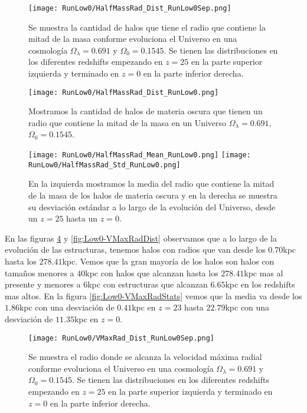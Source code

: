 \begin{figure}[H]
    \centering
    \texttt{[image: RunLow0/HalfMassRad\_Dist\_RunLow0Sep.png]}
    \caption[Radio que contiene la mitad de la masa]{\footnotesize Se muestra la cantidad de halos que tiene el radio que contiene la mitad de la masa conforme evoluciona el Universo en una cosmología $\Omega_\lambda = 0.691$ y $\Omega_0 = 0.1545$. Se tienen las distribuciones en los diferentes redshifts empezando en $z=25$ en la parte superior izquierda y terminado en $z=0$ en la parte inferior derecha.}
    \label{fig:Low0-HalfMassRadDistSep}
\end{figure}

\begin{figure}[H]
    \centering
    \texttt{[image: RunLow0/HalfMassRad\_Dist\_RunLow0.png]}
    \caption[Distribución del radio que contiene la mitad de la masa]{\footnotesize Mostramos la cantidad de halos de materia oscura que tienen un radio que contiene la mitad de la masa en un Universo $\Omega_\lambda = 0.691$, $\Omega_0 = 0.1545$.}
    \label{fig:Low0-HalfMassRadDist}
\end{figure}

\begin{figure}[H]
    \centering
    \texttt{[image: RunLow0/HalfMassRad\_Mean\_RunLow0.png]}
    \texttt{[image: RunLow0/HalfMassRad\_Std\_RunLow0.png]}
    \caption[Media y desviación estándar del radio de la mitad de la masa]{\footnotesize En la izquierda mostramos la media del radio que contiene la mitad de la masa de los halos de materia oscura y en la derecha se muestra su desviación estándar a lo largo de la evolución del Universo, desde un $z=25$ hasta un $z=0$.}
    \label{fig:Low0-HalfMassRadStats}
\end{figure}

En las figuras \ref{fig:Low0-VMaxRadDistSep} y \ref{fig:Low0-VMaxRadDist} observamos que a lo largo de la evolución de las estructuras, tenemos halos con radios que van desde los $0.70$kpc hasta los $278.41$kpc. Vemos que la gran mayoría de los halos son halos con tamaños menores a $40$kpc con halos que alcanzan hasta los $278.41$kpc mas al presente y menores a $6$kpc con estructuras que alcanzan $6.65$kpc en los redshifts mas altos. En la figura \ref{fig:Low0-VMaxRadStats} vemos que la media va desde los $1.86$kpc con una desviación de $0.41$kpc en $z=23$ hasta $22.79$kpc con una desviación de $11.35$kpc en $z=0$.

\begin{figure}[H]
    \centering
    \texttt{[image: RunLow0/VMaxRad\_Dist\_RunLow0Sep.png]}
    \caption[Radio donde se alcanza la velocidad máxima radial]{\footnotesize Se muestra el radio donde se alcanza la velocidad máxima radial conforme evoluciona el Universo en una cosmología $\Omega_\lambda = 0.691$ y $\Omega_0 = 0.1545$. Se tienen las distribuciones en los diferentes redshifts empezando en $z=25$ en la parte superior izquierda y terminado en $z=0$ en la parte inferior derecha.}
    \label{fig:Low0-VMaxRadDistSep}
\end{figure}

